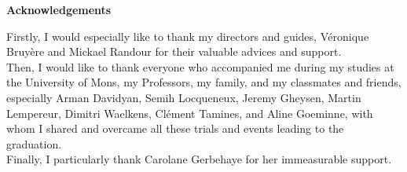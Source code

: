 \documentclass[12pt, twoside, openright]{report}
\let\tmp\oddsidemargin
\let\oddsidemargin\evensidemargin
\let\evensidemargin\tmp
\theoremstyle{mystyle}
\theoremstyle{definition}%
\theoremstyle{remark}
\begin{document}
\let\tmp\oddsidemargin
\let\oddsidemargin\evensidemargin
\let\evensidemargin\tmp
\reversemarginpar

\begingroup
  \pagestyle{empty}
  \null
  \newpage
\endgroup


\begingroup
  \thispagestyle{empty}
  \null
  \newpage
\endgroup

\begin{flushright}
{\Large \textbf{Acknowledgements}} \\
\end{flushright}

\noindent Firstly, I would especially like to thank my directors and guides, Véronique Bruyère and Mickael Randour for their valuable advices and support.\\
Then, I would like to thank everyone who accompanied me during my studies at the University of Mons, my Professors, my family, and my classmates and friends, especially Arman Davidyan, Semih Locqueneux, Jeremy Gheysen, Martin Lempereur, Dimitri Waelkens, Clément Tamines, and Aline Goeminne, with whom I shared and overcame all these trials and events leading to the graduation.\\
Finally, I particularly thank Carolane Gerbehaye for her immeasurable support.
\thispagestyle{empty}

\clearpage %
\begingroup
  \thispagestyle{empty}
  \null
  \newpage
\endgroup


\tableofcontents
  \clearpage %
  \begingroup
    \thispagestyle{empty}
    \null
    \newpage
  \endgroup












\end{document}
